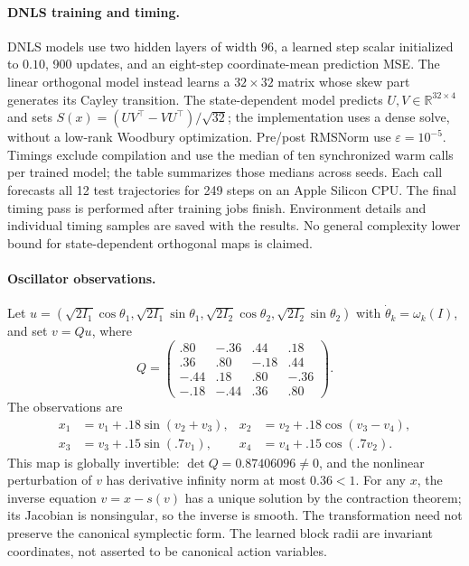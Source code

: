 \documentclass[10pt]{article}
\theoremstyle{definition}
\theoremstyle{remark}
\newcommand{\R}{\mathbb{R}}
\begin{document}
\paragraph{DNLS training and timing.}
DNLS models use two hidden layers of width 96, a learned step scalar initialized to $0.10$, 900 updates, and an eight-step coordinate-mean prediction MSE. The linear orthogonal model instead learns a $32\times32$ matrix whose skew part generates its Cayley transition. The state-dependent model predicts $U,V\in\R^{32\times4}$ and sets $S(x)=(UV^\top-VU^\top)/\sqrt{32}$; the implementation uses a dense solve, without a low-rank Woodbury optimization. Pre/post RMSNorm use $\varepsilon=10^{-5}$. Timings exclude compilation and use the median of ten synchronized warm calls per trained model; the table summarizes those medians across seeds. Each call forecasts all 12 test trajectories for 249 steps on an Apple Silicon CPU. The final timing pass is performed after training jobs finish. Environment details and individual timing samples are saved with the results. No general complexity lower bound for state-dependent orthogonal maps is claimed.

\paragraph{Oscillator observations.}
Let $u=(\sqrt{2I_1}\cos\theta_1,\sqrt{2I_1}\sin\theta_1,\sqrt{2I_2}\cos\theta_2,\sqrt{2I_2}\sin\theta_2)$ with $\dot\theta_k=\omega_k(I)$, and set $v=Qu$, where
\begin{equation}
 Q=\begin{pmatrix}
 .80&-.36&.44&.18\\ .36&.80&-.18&.44\\
 -.44&.18&.80&-.36\\ -.18&-.44&.36&.80
 \end{pmatrix}.
\end{equation}
The observations are
\begin{align}
 x_1&=v_1+.18\sin(v_2+v_3),& x_2&=v_2+.18\cos(v_3-v_4),\nonumber\\
 x_3&=v_3+.15\sin(.7v_1),& x_4&=v_4+.15\cos(.7v_2).
\end{align}
This map is globally invertible: $\det Q=0.87406096\ne0$, and the nonlinear perturbation of $v$ has derivative infinity norm at most $0.36<1$. For any $x$, the inverse equation $v=x-s(v)$ has a unique solution by the contraction theorem; its Jacobian is nonsingular, so the inverse is smooth. The transformation need not preserve the canonical symplectic form. The learned block radii are invariant coordinates, not asserted to be canonical action variables.
\end{document}
